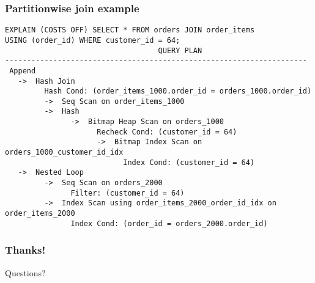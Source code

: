 \begin{frame}[fragile]
  \frametitle{Partitionwise join example}

\footnotesize
  \begin{lstlisting}
EXPLAIN (COSTS OFF) SELECT * FROM orders JOIN order_items
USING (order_id) WHERE customer_id = 64;
                                   QUERY PLAN                       
---------------------------------------------------------------------
 Append
   ->  Hash Join
         Hash Cond: (order_items_1000.order_id = orders_1000.order_id)
         ->  Seq Scan on order_items_1000
         ->  Hash
               ->  Bitmap Heap Scan on orders_1000
                     Recheck Cond: (customer_id = 64)
                     ->  Bitmap Index Scan on orders_1000_customer_id_idx
                           Index Cond: (customer_id = 64)
   ->  Nested Loop
         ->  Seq Scan on orders_2000
               Filter: (customer_id = 64)
         ->  Index Scan using order_items_2000_order_id_idx on order_items_2000
               Index Cond: (order_id = orders_2000.order_id)
  \end{lstlisting}

\end{frame}

\begin{frame}
  \frametitle{Thanks!}

  Questions?

\end{frame}
